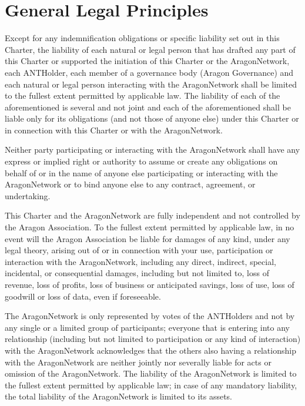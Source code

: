 \section{General Legal Principles}

Except for any indemnification obligations or specific liability set out in this Charter, the liability of each natural or legal person that has drafted any part of this Charter or supported the initiation of this Charter or the \gls{AragonNetwork}, each \gls{ANTHolder}, each member of a governance body (Aragon Governance) and each natural or legal person interacting with the \gls{AragonNetwork} shall be limited to the fullest extent permitted by applicable law.
The liability of each of the aforementioned is several and not joint and each of the aforementioned shall be liable only for its obligations (and not those of anyone else) under this Charter or in connection with this Charter or with the \gls{AragonNetwork}.

Neither party participating or interacting with the \gls{AragonNetwork} shall have any 
express or implied right or authority to assume or create any obligations on behalf of or in the name of anyone else participating or interacting with the \gls{AragonNetwork} or to bind anyone else to any contract, agreement, or undertaking.

This Charter and the \gls{AragonNetwork} are fully independent and not controlled by the Aragon Association.
To the fullest extent permitted by applicable law, in no event will the Aragon Association be liable for damages of any kind, under any legal theory, arising out of or in connection with your use, participation or interaction with the \gls{AragonNetwork}, including any direct, indirect, special, incidental, or consequential damages, including but not limited to, loss of revenue, loss of profits, loss of business or anticipated savings, loss of use, loss of goodwill or loss of data, even if foreseeable.

The \gls{AragonNetwork} is only represented by votes of the \glspl{ANTHolder} and not by any single or a limited group of participants; 
everyone that is entering into any relationship (including but not limited to participation or any kind of interaction) with the \gls{AragonNetwork} acknowledges that the others also having a relationship with the \gls{AragonNetwork} are neither jointly nor severally liable for acts or omission of the \gls{AragonNetwork}.
The liability of the \gls{AragonNetwork} is limited to the fullest extent permitted by applicable law; in case of any mandatory liability, the total liability of the \gls{AragonNetwork} is limited to its assets.

